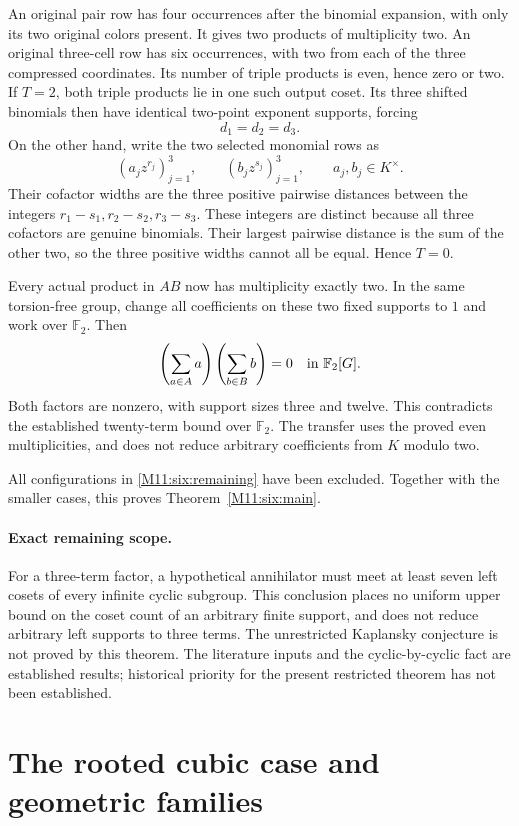 \documentclass[11pt,a4paper,oneside]{report}
\theoremstyle{definition}
\theoremstyle{remark}
\begin{document}
An original pair row has four occurrences after the binomial expansion,
with only its two original colors present. It gives two products of
multiplicity two. An original three-cell row has six occurrences, with
two from each of the three compressed coordinates. Its number of
triple products is even, hence zero or two. If \(T=2\), both triple
products lie in one such output coset. Its three shifted binomials then
have identical two-point exponent supports, forcing
\[
 d_1=d_2=d_3.
\]
On the other hand, write the two selected monomial rows as
\[
 (a_jz^{r_j})_{j=1}^3,\qquad (b_jz^{s_j})_{j=1}^3,
 \qquad a_j,b_j\in K^\times.
\]
Their cofactor widths are the three positive pairwise distances between
the integers \(r_1-s_1,r_2-s_2,r_3-s_3\). These integers are distinct
because all three cofactors are genuine binomials. Their largest
pairwise distance is the sum of the other two, so the three positive
widths cannot all be equal. Hence \(T=0\).

Every actual product in \(AB\) now has multiplicity exactly two. In the
same torsion-free group, change all coefficients on these two fixed
supports to \(1\) and work over \(\mathbb F_2\). Then
\[
 \left(\sum_{a\in A}a\right)
 \left(\sum_{b\in B}b\right)=0
 \quad\hbox{in }\mathbb F_2[G].
\]
Both factors are nonzero, with support sizes three and twelve. This
contradicts the established twenty-term bound over \(\mathbb F_2\).
The transfer uses the proved even multiplicities, and does not reduce
arbitrary coefficients from \(K\) modulo two.

All configurations in \eqref{M11:six:remaining} have been excluded. Together
with the smaller cases, this proves Theorem~\ref{M11:six:main}.

\paragraph{Exact remaining scope.}
For a three-term factor, a hypothetical annihilator must meet at least
seven left cosets of every infinite cyclic subgroup. This conclusion
places no uniform upper bound on the coset count of an arbitrary finite
support, and does not reduce arbitrary left supports to three terms.
The unrestricted Kaplansky conjecture is not proved by this theorem.
The literature inputs and the cyclic-by-cyclic fact are established
results; historical priority for the present restricted theorem has
not been established.

\section{The rooted cubic case and geometric families}
\label{M11:root:section}
\end{document}
